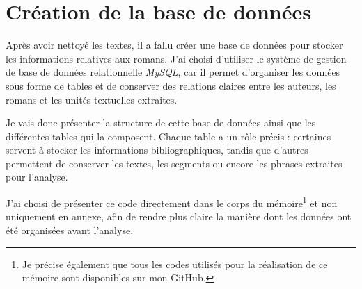 \section{Création de la base de données}

Après avoir nettoyé les textes, il a fallu créer une base de données pour stocker les informations relatives aux romans. J'ai choisi d'utiliser le système de gestion de base de données relationnelle \textsl{MySQL}, car il permet d'organiser les données sous forme de tables et de conserver des relations claires entre les auteurs, les romans et les unités textuelles extraites.

Je vais donc présenter la structure de cette base de données ainsi que les différentes tables qui la composent. Chaque table a un rôle précis : certaines servent à stocker les informations bibliographiques, tandis que d'autres permettent de conserver les textes, les segments ou encore les phrases extraites pour l'analyse.

J'ai choisi de présenter ce code directement dans le corps du mémoire\footnote{Je précise également que tous les codes utilisés pour la réalisation de ce mémoire sont disponibles sur mon GitHub.} et non uniquement en annexe, afin de rendre plus claire la manière dont les données ont été organisées avant l'analyse. 

